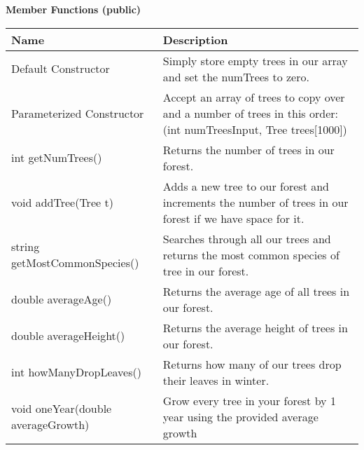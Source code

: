 \textbf{Member Functions (public)}
\begin{table}[H]
    \centering
    \begin{tabular}{p{2in}|p{4in}}
Name & Description \\ \hline
Default Constructor & Simply store empty trees in our array and set the numTrees to zero.\\
Parameterized Constructor & Accept an array of trees to copy over and a number of trees in this order: (int numTreesInput, Tree trees[1000])\\
int getNumTrees() & Returns the number of trees in our forest. \\
void addTree(Tree t) & Adds a new tree to our forest and increments the number of trees in our forest if we have space for it. \\
string getMostCommonSpecies() & Searches through all our trees and returns the most common species of tree in our forest. \\
double averageAge() & Returns the average age of all trees in our forest. \\
double averageHeight() & Returns the average height of trees in our forest. \\
int howManyDropLeaves() & Returns how many of our trees drop their leaves in winter. \\
void oneYear(double averageGrowth) & Grow every tree in your forest by 1 year using the provided average growth\\
    \end{tabular}
\end{table}
